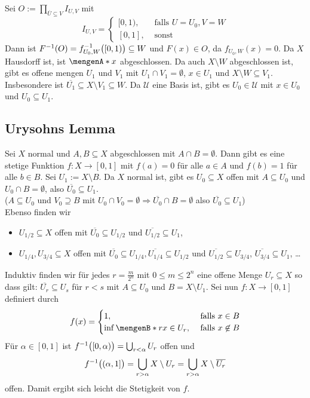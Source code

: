 Sei $O := \prod_{\overline{U} \subseteq V} I_{U,V}$ mit 
\[
	I_{U,V} = \begin{cases}
		[0,1), &\text{ falls }U=U_0, V=W\\
		[0,1], &\text{ sonst}
	\end{cases}
\]
Dann ist $F ^{-1}(O) = f ^{-1}_{U_0, W} \enbrace[\big]{[0,1)} \subseteq W$ und $F(x) \in O$, da $f_{U_0, W} (x) = 0$.
Da $X$ Hausdorff ist, ist $\set{x}$ abgeschlossen. Da auch $X \setminus W$ abgeschlossen ist, gibt es offene mengen $U_1$ und $V_1$ mit $U_1 \cap V_1 = \emptyset$, $x \in U_1$ und
$X \setminus W \subseteq V_1$. Insbesondere ist $\overline{U_1} \subseteq X \setminus V_1 \subseteq W $. Da $\mathcal{U}$ eine Basis ist, gibt es $U_0 \in \mathcal{U}$ mit 
$x \in U_0$ und $U_0 \subseteq U_1$. \bewende

\subsection{Urysohns Lemma} %
\label{sub:74}
Sei $X$ normal und $A,B \subseteq X$ abgeschlossen mit $A \cap B = \emptyset$. Dann gibt es eine stetige Funktion $f : X \to [0,1]$ mit $f(a) = 0$ für alle $a \in A$ und
$f(b)= 1$ für alle $b \in B$.
Sei $U_1 := X \setminus B$. Da $X$ normal ist, gibt es $U_0 \subseteq X$ offen mit $A \subseteq U_0$ und $U_0 \cap B = \emptyset$, also $\overline{U_0} \subseteq U_1$.\\
($A \subseteq U_0$ und $V_0 \supseteq B$ mit $U_0 \cap V_0 = \emptyset \Rightarrow \overline{U_0} \cap B = \emptyset $ also $\overline{U_0} \subseteq U_1$) \\
Ebenso finden wir 
\begin{itemize}
	\item $U_{1/2} \subseteq X$ offen mit $\overline{U_0} \subseteq U_{1/2}$ und $\overline{U_{1/2}} \subseteq U_1$,
	\item $U_{1/4}, U_{3/4} \subseteq X$ offen mit 
	$\overline{U_0} \subseteq U_{1/4}, \overline{U_{1/4}} \subseteq U_{1/2}$ und $ \overline{U_{1/2}} \subseteq U_{3/4} $, $\overline{U_{3/4}} \subseteq U_1 $, \ldots
\end{itemize}
Induktiv finden wir für jedes $r = \frac{m}{2^n} $ mit $0 \le m \le 2^n$ eine offene Menge $U_r \subseteq X$ so dass gilt: $\overline{U_r} \subseteq U_s $ für $r < s$ mit
$A \subseteq U_0$ und $B= X \setminus U_1$. Sei nun $f : X \to [0,1]$ definiert durch
\[
	f(x) = \begin{cases}
		1, &\text{ falls }x \in B\\
		\inf \set[r]{x \in U_r} , &\text{ falls } x \not\in B
	\end{cases}
\]
Für $\alpha\in [0,1]$ ist $f ^{-1}\enbrace[\big]{[0,\alpha)} = \bigcup_{r <\alpha} U_r$ offen und 
\[
	f ^{-1} \enbrace[\big]{(\alpha,1]} = \bigcup_{r > \alpha} X \setminus U_r = \bigcup_{r > \alpha} X  \setminus \overline{U_r} 
\]
offen. Damit ergibt sich leicht die Stetigkeit von $f$. \bewende
\newpage

